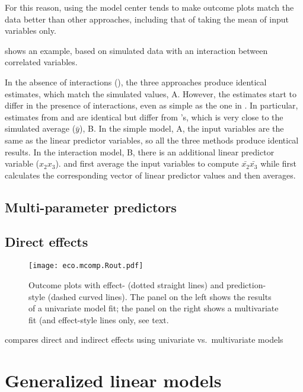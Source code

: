For this reason, using the model center tends to make outcome plots match the data better than other approaches, including that of taking the mean of input variables only.

 shows an example, based on simulated data with an interaction between correlated variables.

In the absence of interactions (), the three approaches produce identical estimates, which match the simulated values, A. However, the estimates start to differ in the presence of interactions, even as simple as the one in . In particular, estimates from  and  are identical but differ from 's, which is very close to the simulated average ($\bar{y}$), B.
In the simple model, A, the input variables are the same as the linear predictor variables, so all the three methods produce identical results.
In the interaction model, B, there is an additional linear predictor variable ($x_2x_3$).  and  first average the input variables to compute $\bar{x_2}\bar{x_3}$ while  first calculates the corresponding vector of linear predictor values and then averages.

\subsection{Multi-parameter predictors}

\subsection{Direct effects}

\begin{figure}
\begin{center}
\texttt{[image: eco.mcomp.Rout.pdf]}
\end{center}
\caption{Outcome plots with effect- (dotted straight lines) and prediction-style (dashed curved lines). The panel on the left shows the results of a univariate model fit; the panel on the right shows a multivariate fit (and effect-style lines only, see text.}
\end{figure}
 compares direct and indirect effects using univariate vs.~multivariate models

\section{Generalized linear models}


